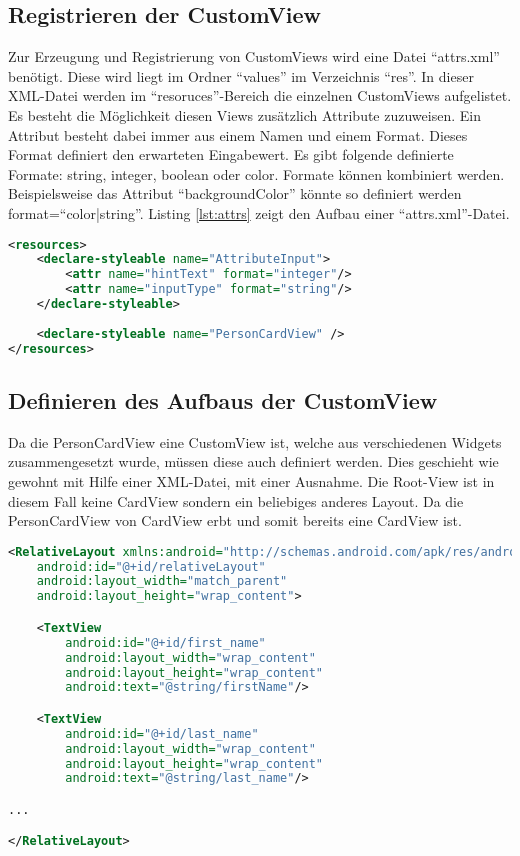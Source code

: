 \subsection{Registrieren der CustomView}
Zur Erzeugung und Registrierung von CustomViews wird eine Datei \enquote{attrs.xml} benötigt. Diese wird liegt im Ordner \enquote{values} im Verzeichnis \enquote{res}. 
In dieser XML-Datei werden im \enquote{resoruces}-Bereich die einzelnen CustomViews aufgelistet. Es besteht die Möglichkeit diesen Views zusätzlich Attribute zuzuweisen. Ein Attribut besteht dabei immer aus einem Namen und einem Format. Dieses Format definiert den erwarteten Eingabewert. Es gibt folgende definierte Formate: string, integer, boolean oder color. 
Formate können kombiniert werden. Beispielsweise das Attribut \enquote{backgroundColor} könnte so definiert werden format=\enquote{color|string}. Listing \ref{lst:attrs} zeigt den Aufbau einer \enquote{attrs.xml}-Datei.

\newpage
\begin{lstlisting}[label=lst:attrs,
language=xml,
firstnumber=1,
caption=Aufbau einer \enquote{attrs.xml} - Datei]				   
<resources>
	<declare-styleable name="AttributeInput">
		<attr name="hintText" format="integer"/>
		<attr name="inputType" format="string"/>
	</declare-styleable>
	
	<declare-styleable name="PersonCardView" />
</resources>
\end{lstlisting}

\subsection{Definieren des Aufbaus der CustomView}

Da die PersonCardView eine CustomView ist, welche aus verschiedenen Widgets zusammengesetzt wurde, müssen diese auch definiert werden. Dies geschieht wie gewohnt mit Hilfe einer XML-Datei, mit einer Ausnahme. Die Root-View ist in diesem Fall keine CardView sondern ein beliebiges anderes Layout. Da die PersonCardView von CardView erbt und somit bereits eine CardView ist.

\begin{lstlisting}[label=lst:personCardViewXml,
language=xml,
firstnumber=1,
caption=Aufbau der PersonCardView mit Hilfe einer XML-Datei]				   
<RelativeLayout xmlns:android="http://schemas.android.com/apk/res/android"
	android:id="@+id/relativeLayout"
	android:layout_width="match_parent"
	android:layout_height="wrap_content">

	<TextView
		android:id="@+id/first_name"
		android:layout_width="wrap_content"
		android:layout_height="wrap_content"
		android:text="@string/firstName"/>

	<TextView
		android:id="@+id/last_name"
		android:layout_width="wrap_content"
		android:layout_height="wrap_content"
		android:text="@string/last_name"/>

...

</RelativeLayout>
\end{lstlisting}

